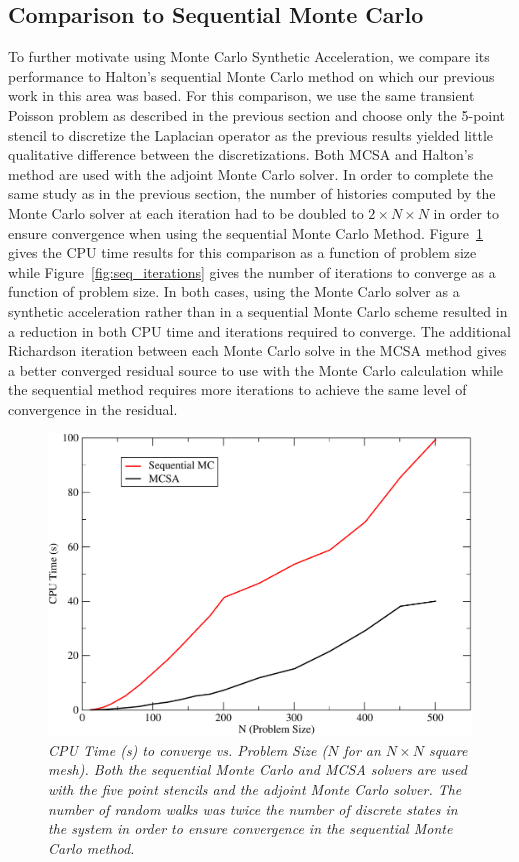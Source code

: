 \documentclass[preprint,12pt]{elsarticle}
\begin{document}
\subsection{Comparison to Sequential Monte Carlo}
\label{subsec:sequential_comparison}
To further motivate using Monte Carlo Synthetic Acceleration, we compare its
performance to Halton's sequential Monte Carlo method on which our previous
work in this area was based. For this comparison, we use the same transient
Poisson problem as described in the previous section and choose only the
5-point stencil to discretize the Laplacian operator as the previous results
yielded little qualitative difference between the discretizations. Both MCSA
and Halton's method are used with the adjoint Monte Carlo solver. In order to
complete the same study as in the previous section, the number of histories
computed by the Monte Carlo solver at each iteration had to be doubled to $2
\times N \times N$ in order to ensure convergence when using the sequential
Monte Carlo Method. Figure~\ref{fig:seq_cpu_time} gives the CPU time results
for this comparison as a function of problem size while
Figure~\ref{fig:seq_iterations} gives the number of iterations to converge as
a function of problem size. In both cases, using the Monte Carlo solver as a
synthetic acceleration rather than in a sequential Monte Carlo scheme resulted
in a reduction in both CPU time and iterations required to converge. The
additional Richardson iteration between each Monte Carlo solve in the MCSA
method gives a better converged residual source to use with the Monte Carlo
calculation while the sequential method requires more iterations to achieve
the same level of convergence in the residual.

\begin{figure}[ht!]
  \centering
  \includegraphics[width=5in,clip]{seq_cpu.pdf}
  \caption{\sl CPU Time (s) to converge vs. Problem Size ($N$ for an
    $N \times N$ square mesh). Both the sequential Monte Carlo and
    MCSA solvers are used with the five point stencils and the adjoint
    Monte Carlo solver. The number of random walks was twice the
    number of discrete states in the system in order to ensure
    convergence in the sequential Monte Carlo method.}
  \label{fig:seq_cpu_time}
\end{figure}
\end{document}
